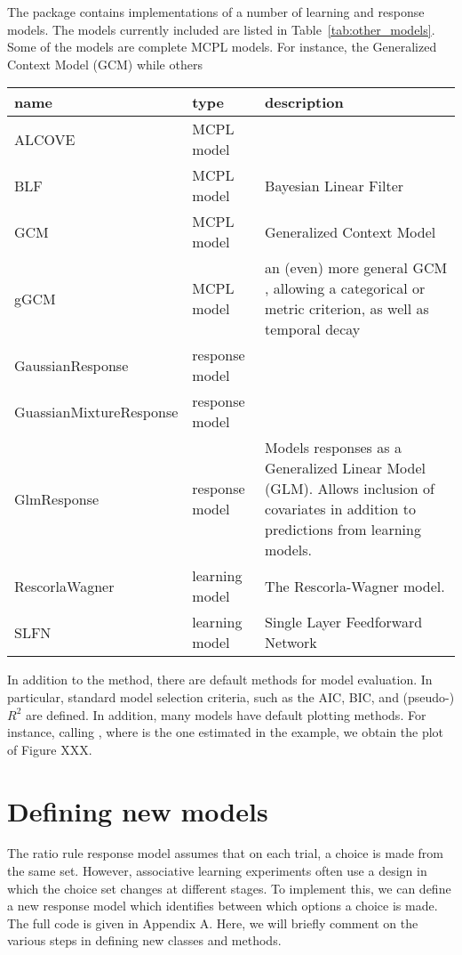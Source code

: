 \documentclass[doc]{apa}
\newcommand{\code}[1]{{\ttfamily{#1}}}
\begin{document}
The package contains implementations of a number of learning and response models. The models currently included are listed in Table~\ref{tab:other_models}. Some of the models are complete MCPL models. For instance, the Generalized Context Model (GCM)  while others 

\begin{table}
\begin{tabular}{lll} \hline
name & type & description \\ \hline
ALCOVE & MCPL model & \\
BLF & MCPL model & Bayesian Linear Filter \cite{Speekenbrink10} \\
GCM  & MCPL model & Generalized Context Model \cite{Nosofsky86} \\
gGCM & MCPL model & an (even) more general GCM  \cite{Speekenbrink10}, allowing a categorical or metric criterion, as well as temporal decay \\
GaussianResponse & response model & \\
GuassianMixtureResponse & response model & \\
GlmResponse & response model & Models responses as a Generalized Linear Model (GLM). Allows inclusion of covariates in addition to predictions from learning models. \\
RescorlaWagner & learning model & The Rescorla-Wagner model. \\
SLFN & learning model & Single Layer Feedforward Network \\ \hline
\end{tabular}
\end{table}



In addition to the \code{fit} method, there are default methods for model evaluation. In particular, standard model selection criteria, such as the AIC, BIC, and (pseudo-) $R^2$ are defined. In addition, many models have default plotting methods. For instance, calling \code{plot()}, where \code{tMod} is the one estimated in the example, we obtain the plot of Figure XXX. 

\section{Defining new models}

The ratio rule response model assumes that on each trial, a choice is made from the same set. However, associative learning experiments often use a design in which the choice set changes at different stages. To implement this, we can define a new response model which identifies between which options a choice is made. The full code is given in Appendix A. Here, we will briefly comment on the various steps in defining new classes and methods. 
\end{document}
